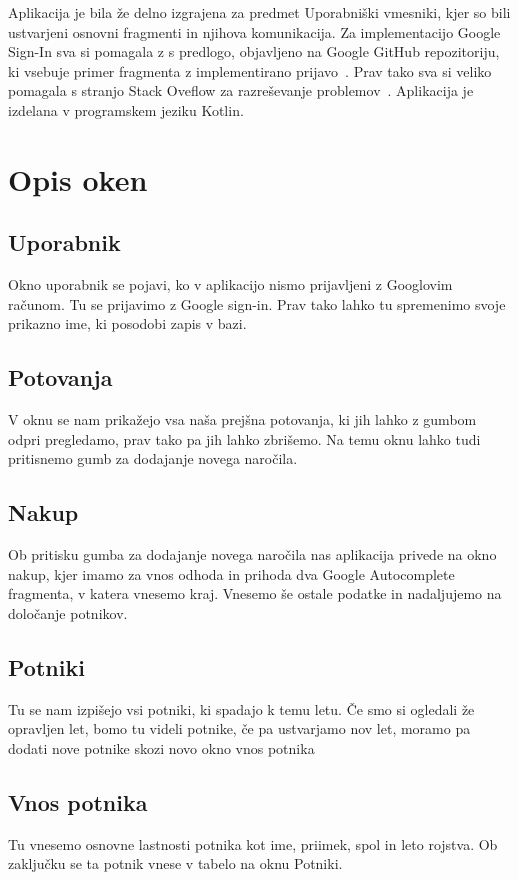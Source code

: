 \documentclass[11pt,a4paper]{article}
\begin{document}
Aplikacija je bila že delno izgrajena za predmet Uporabniški vmesniki, kjer so bili ustvarjeni osnovni fragmenti in njihova komunikacija.
Za implementacijo Google Sign-In sva si pomagala z s predlogo, objavljeno na Google GitHub repozitoriju, ki vsebuje primer fragmenta z implementirano prijavo~\cite{loginSample}.
Prav tako sva si veliko pomagala s stranjo Stack Oveflow za razreševanje problemov~\cite{stack}.
Aplikacija je izdelana v programskem jeziku Kotlin.

\section{Opis oken}
\subsection{Uporabnik}
Okno uporabnik se pojavi, ko v aplikacijo nismo prijavljeni z Googlovim računom.
Tu se prijavimo z Google sign-in. Prav tako lahko tu spremenimo svoje prikazno ime, ki posodobi zapis v bazi.

\subsection{Potovanja}
V oknu se nam prikažejo vsa naša prejšna potovanja, ki jih lahko z gumbom odpri pregledamo, prav tako pa jih lahko zbrišemo.
Na temu oknu lahko tudi pritisnemo gumb za dodajanje novega naročila.

\subsection{Nakup}
Ob pritisku gumba za dodajanje novega naročila nas aplikacija privede na okno nakup, kjer imamo za vnos odhoda in prihoda dva Google Autocomplete fragmenta, v katera vnesemo kraj.
Vnesemo še ostale podatke in nadaljujemo na določanje potnikov.

\subsection{Potniki}
Tu se nam izpišejo vsi potniki, ki spadajo k temu letu. Če smo si ogledali že opravljen let, bomo tu videli potnike, če pa ustvarjamo nov let, moramo pa dodati nove potnike skozi novo okno vnos potnika

\subsection{Vnos potnika}
Tu vnesemo osnovne lastnosti potnika kot ime, priimek, spol in leto rojstva.
Ob zaključku se ta potnik vnese v tabelo na oknu Potniki.
\end{document}
